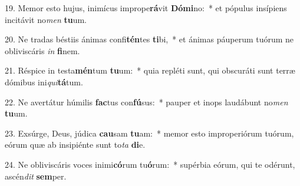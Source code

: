 19. Memor esto hujus, inimícus imprope\textbf{rá}vit \textbf{Dó}\textbf{mi}no:~*  et pópulus insípiens incitávit no\textit{men} \textbf{tu}um.\

20. Ne tradas béstiis ánimas confi\textbf{tén}tes \textbf{ti}bi,~*  et ánimas páuperum tuórum ne obliviscáris \textit{in} \textbf{fi}nem.\

21. Réspice in testa\textbf{mén}tum \textbf{tu}um:~*  quia repléti sunt, qui obscuráti sunt terræ dómibus ini\textit{qui}\textbf{tá}tum.\

22. Ne avertátur húmilis \textbf{fac}tus con\textbf{fú}sus:~*  pauper et inops laudábunt no\textit{men} \textbf{tu}um.\

23. Exsúrge, Deus, júdica \textbf{cau}sam \textbf{tu}am:~*  memor esto improperiórum tuórum, eórum quæ ab insipiénte sunt to\textit{ta} \textbf{di}e.\

24. Ne obliviscáris voces inimi\textbf{có}rum tu\textbf{ó}rum:~*  supérbia eórum, qui te odérunt, ascén\textit{dit} \textbf{sem}per.\

